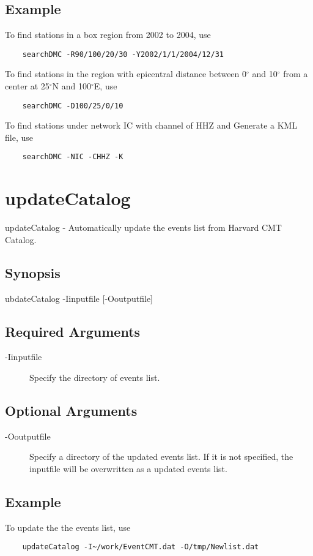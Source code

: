 \documentclass[12pt, a4paper]{report}
\begin{document}
\subsection{Example}
To find stations in a box region from 2002 to 2004, use
\begin{lstlisting}
	searchDMC -R90/100/20/30 -Y2002/1/1/2004/12/31
\end{lstlisting}
To find stations in the region with epicentral distance between 0$^\circ$ and 10$^\circ$ from a center at 25$^\circ$N and 100$^\circ$E, use
\begin{lstlisting}
	searchDMC -D100/25/0/10
\end{lstlisting}
To find stations under network {\C IC} with channel of {\C HHZ} and Generate a KML file, use
\begin{lstlisting}
	searchDMC -NIC -CHHZ -K
\end{lstlisting}

\section{updateCatalog}
updateCatalog - Automatically update the events list from Harvard CMT Catalog.
\subsection{Synopsis}
{\tb ubdateCatalog} {\tb -I}{\ti inputfile} [{\tb -O}{\ti outputfile}]
\subsection{Required Arguments}
\begin{description}
\item[{\tb -I}{\ti inputfile}] Specify the directory of events list.
\end{description}
\subsection{Optional Arguments}
\begin{description}
\item[{\tb -O}{\ti outputfile}] Specify a directory of the updated events list. If it is not specified, the {\ti inputfile} will be overwritten as a updated events list.
\end{description}
\subsection{Example}
To update the the events list, use
\begin{lstlisting}
	updateCatalog -I~/work/EventCMT.dat -O/tmp/Newlist.dat 
\end{lstlisting}
\end{document}
